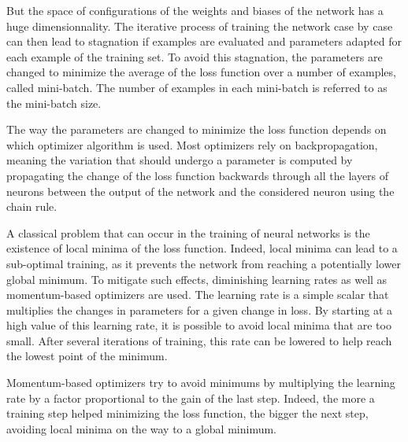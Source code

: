But the space of configurations of the weights and biases of the network has a huge dimensionnality. The iterative process of training the network case by case can then lead to stagnation if examples are evaluated and parameters adapted for each example of the training set. To avoid this stagnation, the parameters are changed to minimize the average of the loss function over a number of examples, called mini-batch. The number of examples in each mini-batch is referred to as the mini-batch size.

The way the parameters are changed to minimize the loss function depends on which optimizer algorithm is used. Most optimizers rely on backpropagation, meaning the variation that should undergo a parameter is computed by propagating the change of the loss function backwards through all the layers of neurons between the output of the network and the considered neuron using the chain rule.\newline


A classical problem that can occur in the training of neural networks is the existence of local minima of the loss function. Indeed, local minima can lead to a sub-optimal training, as it prevents the network from reaching a potentially lower global minimum. To mitigate such effects, diminishing learning rates as well as momentum-based optimizers are used. The learning rate is a simple scalar that multiplies the changes in parameters for a given change in loss. By starting at a high value of this learning rate, it is possible to avoid local minima that are too small. After several iterations of training, this rate can be lowered to help reach the lowest point of the minimum. 

Momentum-based optimizers try to avoid minimums by multiplying the learning rate by a factor proportional to the gain of the last step. Indeed, the more a training step helped minimizing the loss function, the bigger the next step, avoiding local minima on the way to a global minimum.\newline

